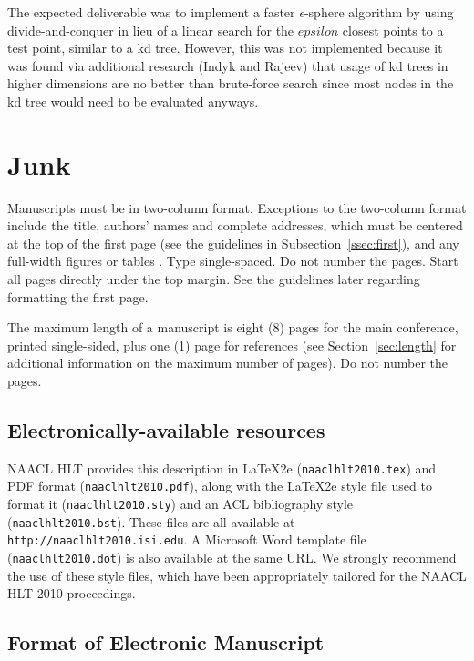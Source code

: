 \documentclass[11pt,letterpaper]{article}
\begin{document}
The expected deliverable was to implement a faster $\epsilon$-sphere algorithm by using divide-and-conquer in lieu of a linear search for the $epsilon$ closest points to a test point, similar to a kd tree. However, this was not implemented because it was found via additional research (Indyk and Rajeev) that usage of kd trees in higher dimensions are no better than brute-force search since most nodes in the kd tree would need to be evaluated anyways.


\section{Junk}
Manuscripts must be in two-column format.  Exceptions to the
two-column format include the title, authors' names and complete
addresses, which must be centered at the top of the first page (see
the guidelines in Subsection~\ref{ssec:first}), and any full-width
figures or tables .  Type single-spaced.  Do not number the pages.
Start all pages directly under the top margin.  See the guidelines
later regarding formatting the first page.

The maximum length of a manuscript is eight (8) pages for the main
conference, printed single-sided, plus one (1) page for references
(see Section~\ref{sec:length} for additional information on the
maximum number of pages).  Do not number the pages.

\subsection{Electronically-available resources}

NAACL HLT provides this description in \LaTeX2e{} ({\tt naaclhlt2010.tex}) and PDF
format ({\tt naaclhlt2010.pdf}), along with the \LaTeX2e{} style file used to
format it ({\tt naaclhlt2010.sty}) and an ACL bibliography style ({\tt naaclhlt2010.bst}).
These files are all available at
{\tt http://naaclhlt2010.isi.edu}.  A Microsoft Word
template file ({\tt naaclhlt2010.dot}) is also available at the same URL. We
strongly recommend the use of these style files, which have been
appropriately tailored for the NAACL HLT 2010 proceedings.


\subsection{Format of Electronic Manuscript}
\label{sect:pdf}
\end{document}
